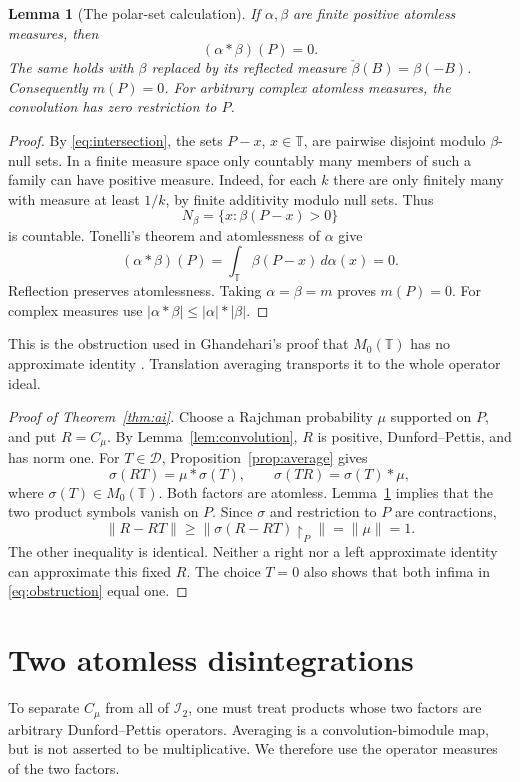 \documentclass[11pt,reqno]{amsart}
\newtheorem{lemma}[theorem]{Lemma}
\theoremstyle{definition}
\theoremstyle{remark}
\newcommand{\T}{\mathbb T}
\newcommand{\D}{\mathcal D}
\newcommand{\I}{\mathcal I}
\newcommand{\restr}[2]{#1\!\upharpoonright_{#2}}
\begin{document}
\begin{lemma}[The polar-set calculation]\label{lem:polar}
If $\alpha,\beta$ are finite positive atomless measures, then
\[
 (\alpha*\beta)(P)=0.
\]
The same holds with $\beta$ replaced by its reflected measure $\check\beta(B)=\beta(-B)$. Consequently $m(P)=0$. For arbitrary complex atomless measures, the convolution has zero restriction to $P$.
\end{lemma}
\begin{proof}
By \eqref{eq:intersection}, the sets $P-x$, $x\in\T$, are pairwise disjoint modulo $\beta$-null sets. In a finite measure space only countably many members of such a family can have positive measure. Indeed, for each $k$ there are only finitely many with measure at least $1/k$, by finite additivity modulo null sets. Thus
\[
 N_\beta=\{x:\beta(P-x)>0\}
\]
is countable. Tonelli's theorem and atomlessness of $\alpha$ give
\[
 (\alpha*\beta)(P)=\int_\T\beta(P-x)\,d\alpha(x)=0.
\]
Reflection preserves atomlessness. Taking $\alpha=\beta=m$ proves $m(P)=0$. For complex measures use $|\alpha*\beta|\leq|\alpha|*|\beta|$.
\end{proof}

This is the obstruction used in Ghandehari's proof that $M_0(\T)$ has no approximate identity \cite[Theorem~3.3]{Gh12}. Translation averaging transports it to the whole operator ideal.

\begin{proof}[Proof of Theorem~\ref{thm:ai}]
Choose a Rajchman probability $\mu$ supported on $P$, and put $R=C_\mu$. By Lemma~\ref{lem:convolution}, $R$ is positive, Dunford--Pettis, and has norm one. For $T\in\D$, Proposition~\ref{prop:average} gives
\[
 \sigma(RT)=\mu*\sigma(T),\qquad
 \sigma(TR)=\sigma(T)*\mu,
\]
where $\sigma(T)\in M_0(\T)$. Both factors are atomless. Lemma~\ref{lem:polar} implies that the two product symbols vanish on $P$. Since $\sigma$ and restriction to $P$ are contractions,
\[
 \|R-RT\|\geq
 \|\restr{\sigma(R-RT)}{P}\|=\|\mu\|=1.
\]
The other inequality is identical. Neither a right nor a left approximate identity can approximate this fixed $R$. The choice $T=0$ also shows that both infima in \eqref{eq:obstruction} equal one.
\end{proof}

\section{Two atomless disintegrations}\label{sec:kernels}

To separate $C_\mu$ from all of $\I_2$, one must treat products whose two factors are arbitrary Dunford--Pettis operators. Averaging is a convolution-bimodule map, but is not asserted to be multiplicative. We therefore use the operator measures of the two factors.
\end{document}
